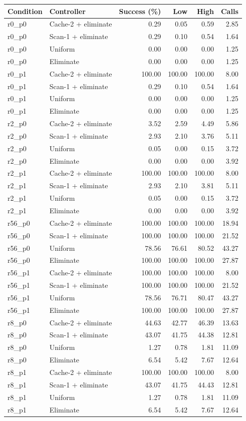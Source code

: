 \begin{longtable}{llrrrr}
\toprule
Condition & Controller & Success (\%) & Low & High & Calls\\
\midrule
\endhead
r0\_p0 & Cache-2 + eliminate & 0.29 & 0.05 & 0.59 & 2.85\\
r0\_p0 & Scan-1 + eliminate & 0.29 & 0.10 & 0.54 & 1.64\\
r0\_p0 & Uniform & 0.00 & 0.00 & 0.00 & 1.25\\
r0\_p0 & Eliminate & 0.00 & 0.00 & 0.00 & 1.25\\
r0\_p1 & Cache-2 + eliminate & 100.00 & 100.00 & 100.00 & 8.00\\
r0\_p1 & Scan-1 + eliminate & 0.29 & 0.10 & 0.54 & 1.64\\
r0\_p1 & Uniform & 0.00 & 0.00 & 0.00 & 1.25\\
r0\_p1 & Eliminate & 0.00 & 0.00 & 0.00 & 1.25\\
r2\_p0 & Cache-2 + eliminate & 3.52 & 2.59 & 4.49 & 5.86\\
r2\_p0 & Scan-1 + eliminate & 2.93 & 2.10 & 3.76 & 5.11\\
r2\_p0 & Uniform & 0.05 & 0.00 & 0.15 & 3.72\\
r2\_p0 & Eliminate & 0.00 & 0.00 & 0.00 & 3.92\\
r2\_p1 & Cache-2 + eliminate & 100.00 & 100.00 & 100.00 & 8.00\\
r2\_p1 & Scan-1 + eliminate & 2.93 & 2.10 & 3.81 & 5.11\\
r2\_p1 & Uniform & 0.05 & 0.00 & 0.15 & 3.72\\
r2\_p1 & Eliminate & 0.00 & 0.00 & 0.00 & 3.92\\
r56\_p0 & Cache-2 + eliminate & 100.00 & 100.00 & 100.00 & 18.94\\
r56\_p0 & Scan-1 + eliminate & 100.00 & 100.00 & 100.00 & 21.52\\
r56\_p0 & Uniform & 78.56 & 76.61 & 80.52 & 43.27\\
r56\_p0 & Eliminate & 100.00 & 100.00 & 100.00 & 27.87\\
r56\_p1 & Cache-2 + eliminate & 100.00 & 100.00 & 100.00 & 8.00\\
r56\_p1 & Scan-1 + eliminate & 100.00 & 100.00 & 100.00 & 21.52\\
r56\_p1 & Uniform & 78.56 & 76.71 & 80.47 & 43.27\\
r56\_p1 & Eliminate & 100.00 & 100.00 & 100.00 & 27.87\\
r8\_p0 & Cache-2 + eliminate & 44.63 & 42.77 & 46.39 & 13.63\\
r8\_p0 & Scan-1 + eliminate & 43.07 & 41.75 & 44.38 & 12.81\\
r8\_p0 & Uniform & 1.27 & 0.78 & 1.81 & 11.09\\
r8\_p0 & Eliminate & 6.54 & 5.42 & 7.67 & 12.64\\
r8\_p1 & Cache-2 + eliminate & 100.00 & 100.00 & 100.00 & 8.00\\
r8\_p1 & Scan-1 + eliminate & 43.07 & 41.75 & 44.43 & 12.81\\
r8\_p1 & Uniform & 1.27 & 0.78 & 1.81 & 11.09\\
r8\_p1 & Eliminate & 6.54 & 5.42 & 7.67 & 12.64\\
\bottomrule
\end{longtable}